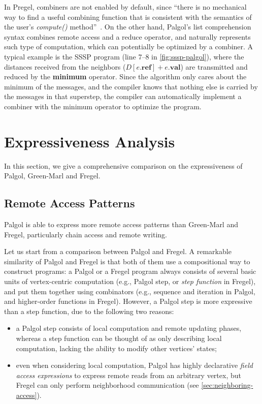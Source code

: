 \documentclass{sokendai_thesis} %
\begin{document}
In Pregel, combiners are not enabled by default, since ``there is no mechanical way to find a useful combining function that is consistent with the semantics of the user's \emph{compute()} method''~\cite{pregel}. %
On the other hand, Palgol's list comprehension syntax combines remote access and a reduce operator, and naturally represents such type of computation, which can potentially be optimized by a combiner.
A typical example is the SSSP program (line 7--8 in \autoref{fig:sssp-palgol}), where the distances received from the neighbors ($D[e.\mathbf{ref}]+e.\mathbf{val}$) are transmitted and reduced by the \textbf{minimum} operator.
Since the algorithm only cares about the minimum of the messages, and the compiler knows that nothing else is carried by the messages in that superstep, the compiler can automatically implement a combiner with the minimum operator to optimize the program.

\chapter{Expressiveness Analysis}
\label{sec:expressiveness}

In this section, we give a comprehensive comparison on the expressiveness of Palgol, Green-Marl and Fregel.

\section{Remote Access Patterns}

Palgol is able to express more remote access patterns than Green-Marl and Fregel, particularly chain access and remote writing.

Let us start from a comparison between Palgol and Fregel.
A remarkable similarity of Palgol and Fregel is that both of them use a compositional way to construct programs:
a Palgol or a Fregel program always consists of several basic units of vertex-centric computation (e.g., Palgol step, or \emph{step function} in Fregel), and put them together using combinators (e.g., sequence and iteration in Palgol, and higher-order functions in Fregel).
However, a Palgol step is more expressive than a step function, due to the following two reasons:
\begin{itemize}
 \item a Palgol step consists of local computation and remote updating phases, whereas a step function can be thought of as only describing local computation, lacking the ability to modify other vertices' states;
 \item even when considering local computation, Palgol has highly declarative \textit{field access expressions} to express remote reads from an arbitrary vertex, but Fregel can only perform neighborhood communication (see \autoref{sec:neighboring-access}).
\end{itemize}
\end{document}
